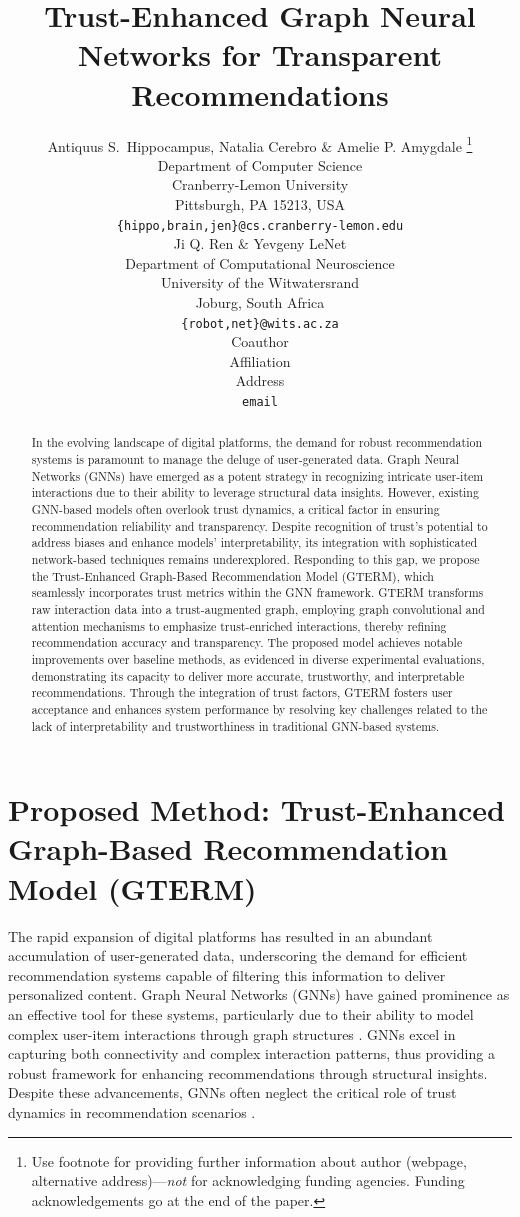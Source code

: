 \documentclass{article} %
\title{Trust-Enhanced Graph Neural Networks for Transparent Recommendations}
\author{Antiquus S.~Hippocampus, Natalia Cerebro \& Amelie P. Amygdale \thanks{ Use footnote for providing further information
about author (webpage, alternative address)---\emph{not} for acknowledging
funding agencies.  Funding acknowledgements go at the end of the paper.} \\
Department of Computer Science\\
Cranberry-Lemon University\\
Pittsburgh, PA 15213, USA \\
\texttt{\{hippo,brain,jen\}@cs.cranberry-lemon.edu} \\
\And
Ji Q. Ren \& Yevgeny LeNet \\
Department of Computational Neuroscience \\
University of the Witwatersrand \\
Joburg, South Africa \\
\texttt{\{robot,net\}@wits.ac.za} \\
\AND
Coauthor \\
Affiliation \\
Address \\
\texttt{email}
}
\begin{document}
\maketitle


\begin{abstract}
In the evolving landscape of digital platforms, the demand for robust recommendation systems is paramount to manage the deluge of user-generated data. Graph Neural Networks (GNNs) have emerged as a potent strategy in recognizing intricate user-item interactions due to their ability to leverage structural data insights. However, existing GNN-based models often overlook trust dynamics, a critical factor in ensuring recommendation reliability and transparency. Despite recognition of trust's potential to address biases and enhance models' interpretability, its integration with sophisticated network-based techniques remains underexplored. Responding to this gap, we propose the Trust-Enhanced Graph-Based Recommendation Model (GTERM), which seamlessly incorporates trust metrics within the GNN framework. GTERM transforms raw interaction data into a trust-augmented graph, employing graph convolutional and attention mechanisms to emphasize trust-enriched interactions, thereby refining recommendation accuracy and transparency. The proposed model achieves notable improvements over baseline methods, as evidenced in diverse experimental evaluations, demonstrating its capacity to deliver more accurate, trustworthy, and interpretable recommendations. Through the integration of trust factors, GTERM fosters user acceptance and enhances system performance by resolving key challenges related to the lack of interpretability and trustworthiness in traditional GNN-based systems.
\end{abstract}

\section{Proposed Method: Trust-Enhanced Graph-Based Recommendation Model (GTERM)}
The rapid expansion of digital platforms has resulted in an abundant accumulation of user-generated data, underscoring the demand for efficient recommendation systems capable of filtering this information to deliver personalized content. Graph Neural Networks (GNNs) have gained prominence as an effective tool for these systems, particularly due to their ability to model complex user-item interactions through graph structures \citep{wu2019neural, kipf2017semi}. GNNs excel in capturing both connectivity and complex interaction patterns, thus providing a robust framework for enhancing recommendations through structural insights. Despite these advancements, GNNs often neglect the critical role of trust dynamics in recommendation scenarios \citep{velickovic2018graph}.
\end{document}
